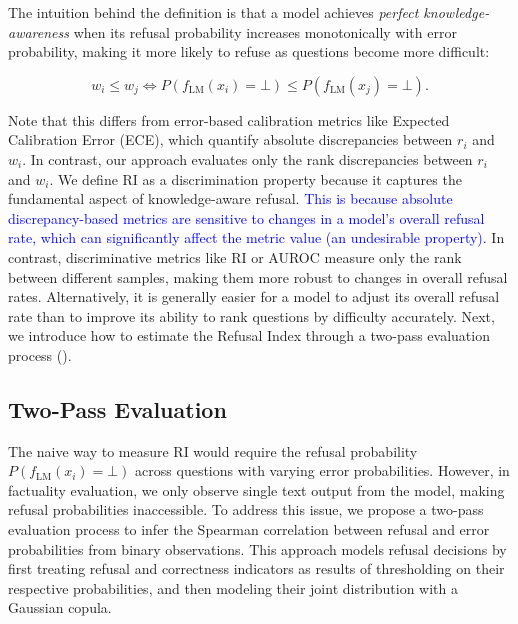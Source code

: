 \documentclass{article} %
\theoremstyle{definition}
\newcommand{\wigglyblue}[1]{\textcolor{blue}{#1}}
\begin{document}
The intuition behind the definition is that a model achieves \emph{perfect knowledge-awareness} when its refusal probability increases monotonically with error probability, making it more likely to refuse as questions become more difficult:

\vspace{-1em}
\begin{equation}
w_i \leq w_j \iff P(f_{\text{LM}}(x_i) = \bot) \leq P(f_{\text{LM}}(x_j) = \bot).
\label{eq:refusal_perfect_calibrated}
\end{equation}
\vspace{-1.5em}

Note that this differs from error-based calibration metrics like Expected Calibration Error (ECE), which quantify absolute discrepancies between $r_i$ and $w_i$. 
In contrast, our approach evaluates only the rank discrepancies between $r_i$ and $w_i$.
We define RI as a discrimination property because it captures the fundamental aspect of knowledge-aware refusal. 
\wigglyblue{This is because absolute discrepancy-based metrics are sensitive to changes in a model's overall refusal rate, which can significantly affect the metric value (an undesirable property).} 
In contrast, discriminative metrics like RI or AUROC measure only the rank between different samples, making them more robust to changes in overall refusal rates. 
Alternatively, it is generally easier for a model to adjust its overall refusal rate than to improve its ability to rank questions by difficulty accurately.
Next, we introduce how to estimate the Refusal Index through a two-pass evaluation process ().


\vspace{-0.5em}
\subsection{Two-Pass Evaluation}
\vspace{-0.5em}
\label{sec:two_pass_evaluation}

The naive way to measure RI would require the refusal probability $P(f_{\text{LM}}(x_i) = \bot)$ across questions with varying error probabilities. 
However, in factuality evaluation, we only observe single text output from the model, making refusal probabilities inaccessible. 
To address this issue, we propose a two-pass evaluation process to infer the Spearman correlation between refusal and error probabilities from binary observations. 
This approach models refusal decisions by first treating refusal and correctness indicators as results of thresholding on their respective probabilities, and then modeling their joint distribution with a Gaussian copula. 
\end{document}
